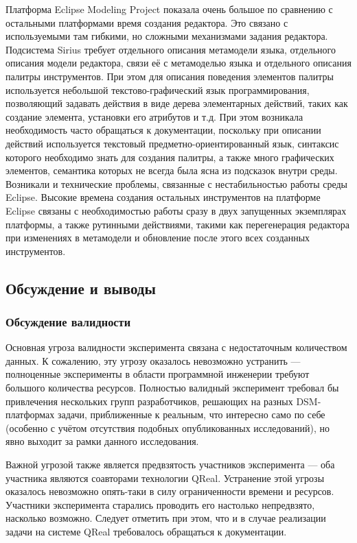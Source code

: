 Платформа Eclipse Modeling Project показала очень большое по сравнению с остальными
платформами время создания редактора. Это связано с используемыми там гибкими, но
сложными механизмами задания редактора. Подсистема Sirius требует отдельного
описания метамодели языка, отдельного описания модели редактора, связи её с метамоделью языка
и отдельного описания палитры инструментов. При этом для описания поведения элементов палитры
используется небольшой текстово-графический язык программирования, позволяющий задавать действия
в виде дерева элементарных действий, таких как создание элемента, установки его атрибутов
и т.д. При этом возникала необходимость часто обращаться к документации, поскольку
при описании действий используется текстовый предметно-ориентированный язык, синтаксис
которого необходимо знать для создания палитры, а также много графических элементов,
семантика которых не всегда была ясна из подсказок внутри среды. Возникали и технические проблемы,
связанные с нестабильностью работы среды Eclipse. Высокие времена создания остальных
инструментов на платформе Eclipse связаны с необходимостью работы сразу в двух запущенных
экземплярах платформы, а также рутинными действиями, такими как перегенерация редактора
при изменениях в метамодели и обновление после этого всех созданных инструментов.

\subsection{Обсуждение и выводы}
\subsubsection{Обсуждение валидности}
Основная угроза валидности эксперимента связана с недостаточным количеством данных.
К сожалению, эту угрозу оказалось невозможно устранить --- полноценные эксперименты 
в области программной инженерии требуют большого количества ресурсов. Полностью валидный
эксперимент требовал бы привлечения нескольких групп разработчиков, решающих на разных
\ac{DSM}-платформах задачи, приближенные к реальным, что интересно само по себе (особенно с 
учётом отсутствия подобных опубликованных исследований), но явно выходит за рамки данного
исследования.

Важной угрозой также является предвзятость участников эксперимента --- оба участника
являются соавторами технологии QReal. Устранение этой угрозы оказалось невозможно
опять-таки в силу ограниченности времени и ресурсов. Участники эксперимента старались
проводить его настолько непредвзято, насколько возможно. Следует отметить при этом, что
и в случае реализации задачи на системе QReal требовалось обращаться к документации.

